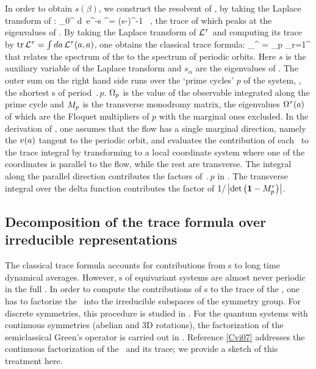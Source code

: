 In order to obtain $s(\beta)$, we construct the resolvent of \Aop , by taking
the Laplace transform of :
\beq
	\int_0^{\infty} \!d\zeit\, e^{-s\zeit} \Lop^\zeit = (s-\Aop)^{-1} \, ,
	\label{eq-ResolventA}
\eeq
the trace of which peaks at the eigenvalues of \Aop. By taking the
Laplace transform of ${\cal L}^{\tau}$ and computing its trace
by $\mbox{\rm tr}\, {\cal L}^{\tau} = \int da \, {\cal L}^{\tau} (a,a)$, one obtains the
classical trace formula:
\beq
\sum_{}^{\infty}  = \sum_p 
\sum_{r=1}^{\infty} 
that relates the spectrum of the {\evOper} to the spectrum of periodic
orbits. Here  $s$ is the auxiliary
variable of the Laplace transform and $s_{\alpha}$ are the eigenvalues of \Aop . The
outer sum on the right hand side runs over the `prime cycles' $p$ of the system,
\ie, the shortest \po s of period $\period{p}$. $\Omega_p$ is the value of
the observable integrated along the prime cycle and ${M}_p$ is the
transverse monodromy matrix, the eigenvalues $\Omega^{\tau} (a)$ of
which are the Floquet multipliers of $p$ with the marginal ones excluded.
In the derivation of , one assumes that
the flow has a single marginal direction, namely the ${v}(a)$ tangent
to the periodic orbit, and evaluates the contribution of each \po\ to the
trace integral by transforming to a local coordinate system where one of
the coordinates is parallel to the flow, while the rest are transverse.
The integral along the parallel direction contributes the factors of
$\period{p}$ in . The transverse integral
over the delta function  contributes the factor of
$1/\left|\mbox{\rm det}\,\!\left({\bf 1}-{M}_p^{r}\right)\right|$.

\subsection{Decomposition of the trace formula over irreducible representations}
\label{s-ContFac}

The classical trace formula  accounts for contributions from \po s
to long time dynamical averages. However, \rpo s of equivariant systems are almost never
periodic in the full \statesp. In order to compute the contributions of \rpo s
to the trace of the \evOper, one has to factorize
the \evOper\
into the irreducible subspaces of the symmetry group. For discrete symmetries,
this procedure is studied in \refref{CvitaEckardt}. For the quantum systems
with continuous symmetries (abelian and 3D rotations), the factorization of
the semiclassical Green's operator is carried out in \refref{Creagh93}.
Reference \ref{Cvi07} addresses the continuous factorization of the \evOper\ and its
trace; we provide a sketch of this treatment here. 

